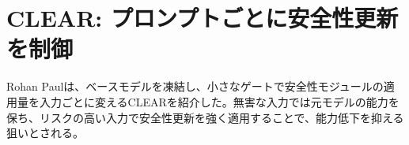 \section{CLEAR: プロンプトごとに安全性更新を制御}
Rohan Paulは、ベースモデルを凍結し、小さなゲートで安全性モジュールの適用量を入力ごとに変えるCLEARを紹介した。無害な入力では元モデルの能力を保ち、リスクの高い入力で安全性更新を強く適用することで、能力低下を抑える狙いとされる。
